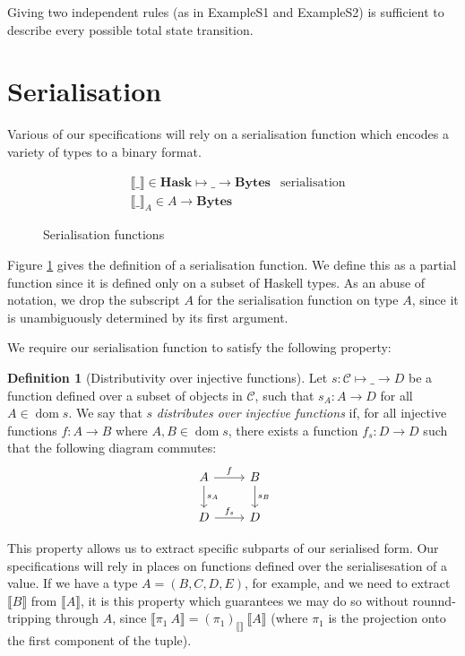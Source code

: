 \documentclass[11pt,a4paper]{article}
\DeclareMathOperator{\dom}{dom}
\newcommand{\var}[1]{\mathit{#1}}
\newcommand{\bytes}{\textbf{Bytes}}
\theoremstyle{definition}
\newtheorem{definition}{Definition}[section]
\theoremstyle{remark}
\begin{document}
Giving two independent rules (as in ExampleS1 and ExampleS2) is
sufficient to describe every possible total state transition.


\section{Serialisation}
Various of our specifications will rely on a serialisation function which
encodes a variety of types to a binary format.

\begin{figure}[h]
  \label{fig:serialisation}
  \begin{align*}
    & \llbracket\_\rrbracket \in \textbf{Hask}\mapsto\_\to\bytes
    & \text{serialisation} \\
    & \llbracket\_\rrbracket_{A} \in \var{A}\to\bytes
  \end{align*}
  \caption{Serialisation functions}
\end{figure}

Figure \ref{fig:serialisation} gives the definition of a serialisation function.
We define this as a partial function since it is defined only on a subset of
Haskell types. As an abuse of notation, we drop the subscript $A$ for the
serialisation function on type $A$, since it is unambiguously determined by its
first argument.

We require our serialisation function to satisfy the following property:
\begin{definition}[Distributivity over injective functions]
  Let $s:\mathcal{C}\mapsto\_\to\var{D}$ be a function defined over a subset of
  objects in $\mathcal{C}$, such that $s_A:A\to\var{D}$ for all $A\in\dom{s}$.
  We say that $s$ \textit{distributes over injective functions} if, for all
  injective functions $f:A\to B$ where $A,B\in\dom{s}$, there exists a function
  $f_s:\var{D}\to\var{D}$ such that the following diagram commutes:
  \[
    \begin{tikzcd}
      A \arrow{r}{f} \arrow{d}{s_A} & B \arrow{d}{s_B} \\
      D \arrow{r}{f_s} & D
    \end{tikzcd}
  \]
\end{definition}

This property allows us to extract specific subparts of our serialised form. Our
specifications will rely in places on functions defined over the serialisesation
of a value. If we have a type $A=(B,C,D,E)$, for example, and we need to extract
$\llbracket\var{B}\rrbracket$ from $\llbracket\var{A}\rrbracket$, it is this
property which guarantees we may do so without rounnd-tripping through $A$,
since $\llbracket \pi_1 ~ A\rrbracket = (\pi_1)_{\llbracket\rrbracket} ~ \llbracket A
\rrbracket$ (where $\pi_1$ is the projection onto the first component of the tuple).
\end{document}
